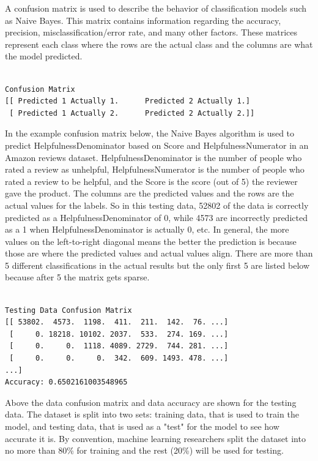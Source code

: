 \documentclass[9pt,twocolumn,twoside]{idsi}
\begin{document}
A confusion matrix is used to describe the behavior of classification models such as Naive Bayes. This matrix contains information regarding the accuracy, precision, misclassification/error rate, and many other factors. These matrices represent each class where the rows are the actual class and the columns are what the model predicted. 
\begin{verbatim}

Confusion Matrix
[[ Predicted 1 Actually 1.		Predicted 2 Actually 1.]
 [ Predicted 1 Actually 2.  	Predicted 2 Actually 2.]]

\end{verbatim}

In the example confusion matrix below, the Naive Bayes algorithm is used to predict HelpfulnessDenominator based on Score and HelpfulnessNumerator in an Amazon reviews dataset. HelpfulnessDenominator is the number of people who rated a review as unhelpful, HelpfulnessNumerator is the number of people who rated a review to be helpful, and the Score is the score (out of 5) the reviewer gave the product. The columns are the predicted values and the rows are the actual values for the labels. So in this testing data, 52802 of the data is correctly predicted as a HelpfulnessDenominator of 0, while 4573 are incorrectly predicted as a 1 when HelpfulnessDenominator is actually 0, etc. In general, the more values on the left-to-right diagonal means the better the prediction is because those are where the predicted values and actual values align. There are more than 5 different classifications in the actual results but the only first 5 are listed below because after 5 the matrix gets sparse.

\begin{verbatim}

Testing Data Confusion Matrix
[[ 53802.  4573.  1198.  411.  211.  142.  76. ...]
 [     0. 18218. 10102. 2037.  533.  274. 169. ...]
 [     0.     0.  1118. 4089. 2729.  744. 281. ...]
 [     0.     0.     0.  342.  609. 1493. 478. ...]
...]
Accuracy: 0.6502161003548965

\end{verbatim}

Above the data confusion matrix and data accuracy are shown for the testing data. The dataset is split into two sets: training data, that is used to train the model, and testing data, that is used as a "test" for the model to see how accurate it is. By convention, machine learning researchers split the dataset into no more than 80\% for training and the rest (20\%) will be used for testing. 
\end{document}
